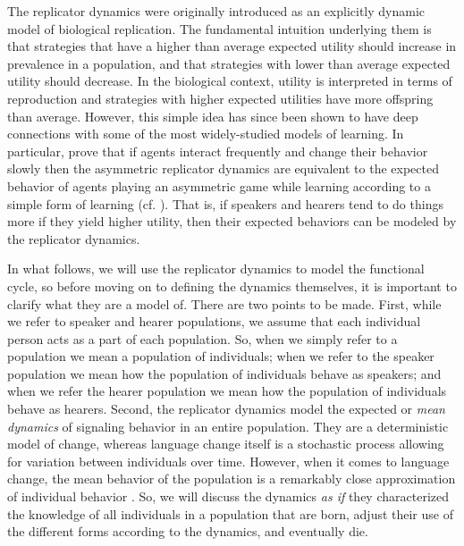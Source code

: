 \documentclass[linguex]{sp}
\theoremstyle{definition} \newtheorem{definition}{Definition}
\begin{document}
The replicator dynamics were originally introduced as an explicitly dynamic model of biological replication. The fundamental intuition underlying them is that strategies that have a higher than average expected utility should increase in prevalence in a population, and that strategies with lower than average expected utility should decrease. In the biological context, utility is interpreted in terms of reproduction and strategies with higher expected utilities have more offspring than average. However, this simple idea has since been shown to have deep connections with some of the most widely-studied models of learning. In particular, \cite{borgers-sarin1997} prove that if agents interact frequently and change their behavior slowly then the asymmetric replicator dynamics are equivalent to the expected behavior of agents playing an asymmetric game while learning according to a simple form of learning (cf. \citealt{bush-mosteller1955, sutton-barto1998}). That is, if speakers and hearers tend to do things more if they yield higher utility, then their expected behaviors can be modeled by the replicator dynamics. 

In what follows, we will use the replicator dynamics to model the functional cycle, so before moving on to defining the dynamics themselves, it is important to clarify what they are a model of. There are two points to be made. First, while we refer to speaker and hearer populations, we assume that each individual person acts as a part of each population. So, when we simply refer to a population we mean a population of individuals; when we refer to the speaker population we mean how the population of individuals behave as speakers; and when we refer the hearer population we mean how the population of individuals behave as hearers. Second, the replicator dynamics model the expected or \emph{mean dynamics} of signaling behavior in an entire population. They are a deterministic model of change, whereas language change itself is a stochastic process allowing for variation between individuals over time.  However, when it comes to language change, the mean behavior of the population is a remarkably close approximation of individual behavior \citep{kroch1989}. So, we will discuss the dynamics \emph{as if} they characterized the knowledge of all individuals in a population that are born, adjust their use of the different forms according to the dynamics, and eventually die. 
\end{document}
